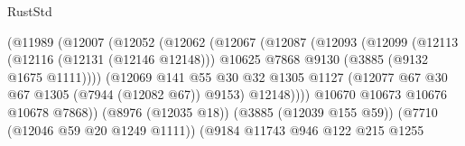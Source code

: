 \begin{lexlean}{RustStd}
\begin{coremodule}
                                        (@11989
                                          (@12007
                                            (@12052
                                              (@12062
                                                (@12067
                                                  (@12087
                                                    (@12093
                                                      (@12099
                                                        (@12113
                                                          (@12116 (@12131 (@12146 @12148)))
                                                          @10625
                                                          @7868
                                                          @9130
                                                          (@3885 (@9132 @1675 @1111))))
                                                      (@12069
                                                        @141
                                                        @55
                                                        @30
                                                        @32
                                                        @1305
                                                        @1127
                                                        (@12077
                                                          @67
                                                          @30
                                                          @67
                                                          @1305
                                                          (@7944 (@12082 @67))
                                                          @9153)
                                                        @12148))))
                                                @10670
                                                @10673
                                                @10676
                                                @10678
                                                @7868))
                                            (@8976 (@12035 @18))
                                            (@3885 (@12039 @155 @59))
                                            (@7710 (@12046 @59 @20 @1249 @1111))
                                            (@9184
                                              @11743
                                              @946
                                              @122
                                              @215
                                              @1255

\end{coremodule}
\end{lexlean}
